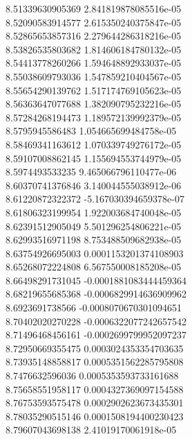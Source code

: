 {8.51339630905369 2.841819878085516e-05 \\
8.52090583914577 2.615350240375847e-05 \\
8.52865653857316 2.279644286318216e-05 \\
8.53826535803682 1.814606184780132e-05 \\
8.54413778260266 1.594648892933037e-05 \\
8.55038609793036 1.547859210404567e-05 \\
8.55654290139762 1.517174769105623e-05 \\
8.56363647077688 1.382090795232216e-05 \\
8.57284268194473 1.189572139992379e-05 \\
8.5795945586483 1.054665699484758e-05 \\
8.58469341163612 1.070339749276172e-05 \\
8.59107008862145 1.155694553744979e-05 \\
8.5974493533235 9.465066796110477e-06 \\
8.60370741376846 3.140044555038912e-06 \\
8.61220872322372 -5.167030394659378e-07 \\
8.61806323199954 1.922003684740048e-05 \\
8.62391512905049 5.501296254806221e-05 \\
8.62993516971198 8.753488509682938e-05 \\
8.63754926695003 0.0001153201374108903 \\
8.65268072224808 6.567550008185208e-05 \\
8.66498291731045 -0.0001881083444459364 \\
8.68219655685368 -0.0006829914636909962 \\
8.6923691738566 -0.0008070670301094651 \\
8.70402020270228 -0.0006322077242657542 \\
8.71496468456161 -0.0002699799952097237 \\
8.72950669355475 0.0003024353354703635 \\
8.73935148858817 0.0005351562285795808 \\
8.7476632596036 0.0005353593733161688 \\
8.75658551958117 0.0004327369097154588 \\
8.76753593575478 0.0002902623673435301 \\
8.78035290515146 0.0001508194400230423 \\
8.79607043698138 2.41019170061918e-05 \\
}
